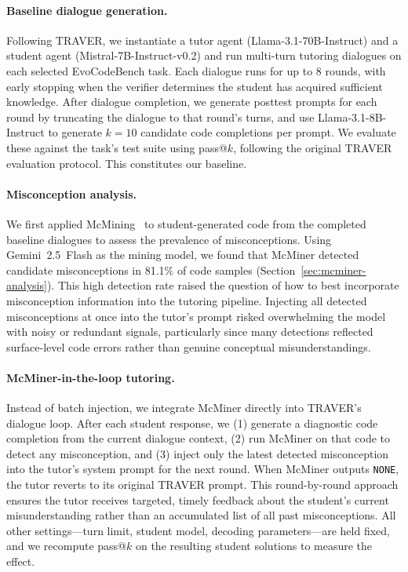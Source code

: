 \documentclass[11pt]{article}
\begin{document}
\paragraph{Baseline dialogue generation.} Following TRAVER, we instantiate a tutor agent (Llama-3.1-70B-Instruct) and a student agent (Mistral-7B-Instruct-v0.2) and run multi-turn tutoring dialogues on each selected EvoCodeBench task. Each dialogue runs for up to 8 rounds, with early stopping when the verifier determines the student has acquired sufficient knowledge. After dialogue completion, we generate posttest prompts for each round by truncating the dialogue to that round's turns, and use Llama-3.1-8B-Instruct to generate $k{=}10$ candidate code completions per prompt. We evaluate these against the task's test suite using pass@$k$, following the original TRAVER evaluation protocol. This constitutes our baseline.

\paragraph{Misconception analysis.} We first applied McMining~\cite{al-hossami-bunescu-2026-mcmining} to student-generated code from the completed baseline dialogues to assess the prevalence of misconceptions. Using Gemini~2.5~Flash as the mining model, we found that McMiner detected candidate misconceptions in 81.1\% of code samples (Section~\ref{sec:mcminer-analysis}). This high detection rate raised the question of how to best incorporate misconception information into the tutoring pipeline. Injecting all detected misconceptions at once into the tutor's prompt risked overwhelming the model with noisy or redundant signals, particularly since many detections reflected surface-level code errors rather than genuine conceptual misunderstandings.

\paragraph{McMiner-in-the-loop tutoring.} Instead of batch injection, we integrate McMiner directly into TRAVER's dialogue loop. After each student response, we (1) generate a diagnostic code completion from the current dialogue context, (2) run McMiner on that code to detect any misconception, and (3) inject only the latest detected misconception into the tutor's system prompt for the next round. When McMiner outputs \texttt{NONE}, the tutor reverts to its original TRAVER prompt. This round-by-round approach ensures the tutor receives targeted, timely feedback about the student's current misunderstanding rather than an accumulated list of all past misconceptions. All other settings---turn limit, student model, decoding parameters---are held fixed, and we recompute pass@$k$ on the resulting student solutions to measure the effect.
\end{document}

